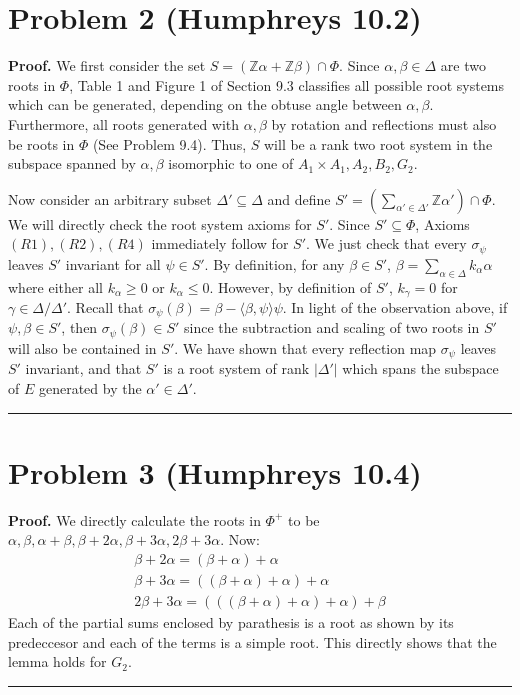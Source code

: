 \documentclass[12pt]{article}%
\newenvironment{proof}[1][Proof]{\textbf{#1.} }{\ \rule{0.5em}{0.5em}}
\begin{document}
\section*{Problem 2 (Humphreys 10.2)}
\begin{proof}
  We first consider the set $S = (\mathbb{Z}\alpha + \mathbb{Z}\beta) \cap \Phi$. Since $\alpha,\beta \in \Delta$ are two roots in $\Phi$, Table 1 and Figure 1 of Section 9.3 classifies all possible root systems which can be generated, depending on the obtuse angle between $\alpha,\beta$. Furthermore, all roots generated with $\alpha,\beta$ by rotation and reflections must also be roots in $\Phi$ (See Problem 9.4). Thus, $S$ will be a rank two root system in the subspace spanned by $\alpha,\beta$ isomorphic to one of $A_1 \times A_1, A_2, B_2, G_2$.
  \newline

  \noindent Now consider an arbitrary subset $\Delta' \subseteq \Delta$ and define $S' = (\sum_{\alpha' \in \Delta'} \mathbb{Z}\alpha') \cap \Phi$. We will directly check the root system axioms for $S'$. Since $S' \subseteq \Phi$, Axioms $(R1),(R2),(R4 )$ immediately follow for $S'$. We just check that every $\sigma_{\psi}$ leaves $S'$ invariant for all $\psi \in S'$.
  By definition, for any $\beta \in S'$, $\beta = \sum_{\alpha \in \Delta} k_{\alpha}\alpha$ where either all $k_{\alpha} \geq 0$ or $k_{\alpha} \leq 0$.
  However, by definition of $S'$, $k_{\gamma} = 0$ for $\gamma \in \Delta / \Delta'$. Recall that $\sigma_{\psi}(\beta) = \beta - \langle \beta,\psi \rangle \psi$. In light of the observation above, if $\psi,\beta \in S'$, then $\sigma_{\psi}(\beta) \in S'$ since the subtraction and scaling of two roots in $S'$ will also be contained in $S'$. We have shown that every reflection map $\sigma_{\psi}$ leaves $S'$ invariant, and that $S'$ is a root system of rank $|\Delta'|$ which spans the subspace of $E$ generated by the $\alpha' \in \Delta'$.
\end{proof}

\section*{Problem 3 (Humphreys 10.4)}
\begin{proof}
We directly calculate the roots in $\Phi^{+}$ to be $\alpha,\beta,\alpha + \beta,\beta + 2\alpha,\beta + 3\alpha, 2\beta + 3\alpha$. Now:
\begin{gather*}
  \beta + 2\alpha = (\beta + \alpha) + \alpha \\
  \beta + 3 \alpha = ((\beta + \alpha) + \alpha) + \alpha \\
  2\beta + 3\alpha = (((\beta + \alpha) + \alpha) + \alpha) + \beta
\end{gather*}
  Each of the partial sums enclosed by parathesis is a root as shown by its predeccesor and each of the terms is a simple root. This directly shows that the lemma holds for $G_2$.
\end{proof}
\end{document}
